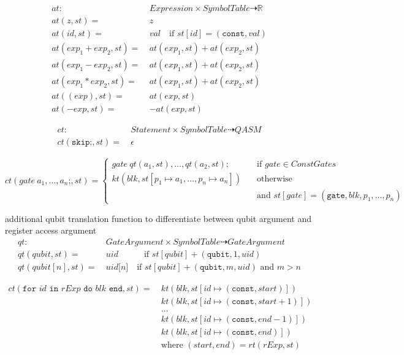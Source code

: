 \begin{align*}
    at : \ & Expression \times SymbolTable \dashrightarrow \mathbb{R}\\
    at(z, st) = \ & z\\
    at(id, st) = \ & val \quad \text{if } st[id] = (\texttt{const}, val)\\
    at(exp_1 + exp_2, st) = \ & at(exp_1, st) + at(exp_2, st)\\
    at(exp_1 - exp_2, st) = \ & at(exp_1, st) + at(exp_2, st)\\
    at(exp_1 * exp_2, st) = \ & at(exp_1, st) + at(exp_2, st)\\
    at((exp), st) = \ & at(exp, st)\\
    at(-exp, st) = \ & -at(exp, st)
\end{align*}


\begin{align*}
    ct : \ & Statement \times SymbolTable \dashrightarrow QASM\\
    ct(\texttt{skip;}, st) = \ & \epsilon
\end{align*}

\begin{equation*}
    ct(gate \ a_1, \dots, a_n\texttt{;}, st) = 
    \begin{cases}
        gate \ qt(a_1, st), \dots, qt(a_2, st); \quad &\text{if } gate \in ConstGates\\
        kt(blk, st[p_1 \mapsto a_1, \dots, p_n \mapsto a_n]) \quad &\text{otherwise }\\
        &\text{and } st[gate] = (\texttt{gate}, blk, p_1, \dots, p_n)
    \end{cases}
\end{equation*}

additional qubit translation function to differentiate between qubit argument and register access argument
\begin{align*}
    qt :\ & \displaystyle GateArgument \times SymbolTable \dashrightarrow GateArgument\\
    qt(qubit, st) = \ & uid \quad\quad\quad \text{if } st[qubit] + (\texttt{qubit}, 1, uid)\\
    qt(qubit[n], st) = \ & uid\texttt{[}n\texttt{]} \quad \text{if } st[qubit] + (\texttt{qubit}, m, uid) \text{ and } m > n
\end{align*}

\begin{align*}
    ct(\texttt{for } id \texttt{ in } rExp \texttt{ do } blk \texttt{ end}, st) = \ 
        & kt(blk, st[id \mapsto (\texttt{const}, start)])\\
        & kt(blk, st[id \mapsto (\texttt{const}, start + 1)])\\
        & \dots\\
        & kt(blk, st[id \mapsto (\texttt{const}, end - 1)])\\
        & kt(blk, st[id \mapsto (\texttt{const}, end)])\\
        & \text{where } (start, end) = rt(rExp, st)
\end{align*}

